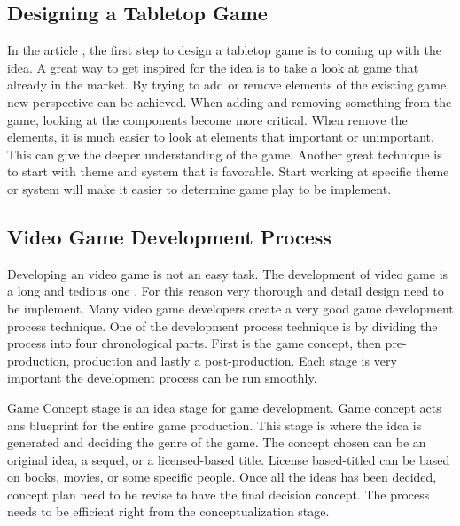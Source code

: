 \documentclass[12pt]{article}
\begin{document}
\subsection{Designing a Tabletop Game}
In the article \cite{design423}, the first step to design a tabletop game is to coming up with the idea. A great way to get inspired for the idea is to take a look at game that already in the market. By trying to add or remove elements of the existing game, new perspective can be achieved. When adding and removing something from the game, looking at the components become more critical. When remove the elements, it is much easier to look at elements that important or unimportant. This can give the deeper understanding of the game. Another great technique is to start with theme and system that is favorable. Start working at specific theme or system will make it easier to determine game play to be implement. 

\subsection{Video Game Development Process}
Developing an video game is not an easy task. The development of video game is a long and tedious one \cite{game09}. For this reason very thorough and detail design need to be implement. Many video game developers create a very good game development process technique. One of the development process technique is by dividing the process into four chronological parts. First is the game concept, then pre-production, production and lastly a post-production. Each stage is very important the development process can be run smoothly.

\par

Game Concept stage is an idea stage for game development. Game concept acts ans blueprint for the entire game production. This stage is where the idea is generated and deciding the genre of the game. The concept chosen can be an original idea, a sequel, or a licensed-based title. License based-titled can be based on books, movies, or some specific people. Once all the ideas has been decided, concept plan need to be revise to have the final decision concept. The process needs to be efficient right from the conceptualization stage.

\par
\end{document}
